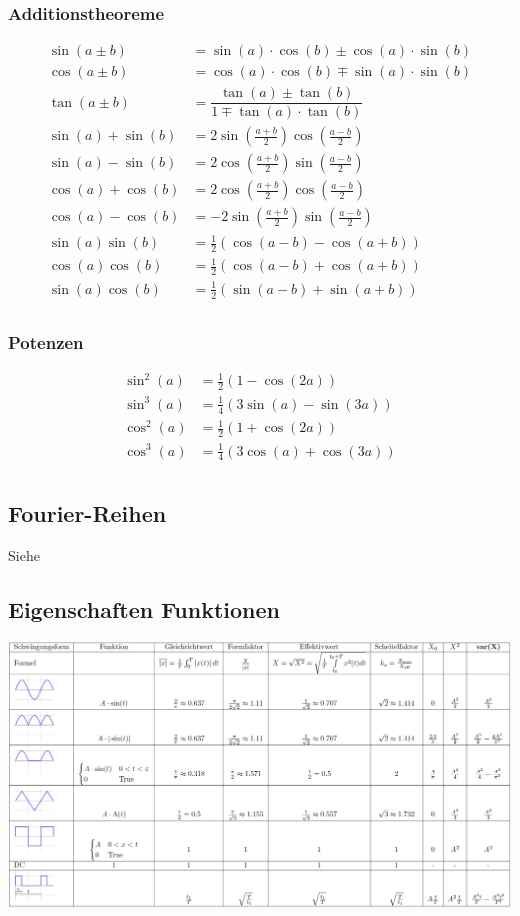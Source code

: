 \subsubsection{Additionstheoreme}
\begin{align*}
	\sin(a \pm b)&=\sin(a) \cdot \cos(b) \pm \cos(a) \cdot \sin(b)\\
	\cos(a \pm b)&=\cos(a) \cdot \cos(b) \mp \sin(a) \cdot \sin(b)\\	
	\tan(a \pm b)&=\dfrac{\tan(a) \pm \tan(b)}{1 \mp \tan(a) \cdot \tan(b)}\\
	\sin(a)+\sin(b) &= 2\sin\left(\frac{a + b}{2}\right)\cos\left(\frac{a - b}{2}\right)\\
	\sin(a)-\sin(b) &= 2\cos\left(\frac{a + b}{2}\right)\sin\left(\frac{a - b}{2}\right)\\
	\cos(a)+\cos(b) &= 2\cos\left(\frac{a + b}{2}\right)\cos\left(\frac{a - b}{2}\right)\\
	\cos(a)-\cos(b) &= -2\sin\left(\frac{a + b}{2}\right)\sin\left(\frac{a - b}{2}\right)\\
	\sin(a)\sin(b)&=\frac{1}{2}(\cos(a-b)-\cos(a+b))\\
	\cos(a)\cos(b)&=\frac{1}{2}(\cos(a-b)+\cos(a+b))\\
	\sin(a)\cos(b)&=\frac{1}{2}(\sin(a-b)+\sin(a+b))\\
\end{align*}

\subsubsection{Potenzen}
\begin{align*}
	\sin^2(a) &= \frac{1}{2}(1 - \cos(2a)) \\
	\sin^3(a) &= \frac{1}{4}(3\sin(a) - \sin(3a)) \\
	\cos^2(a) &= \frac{1}{2}(1 + \cos(2a)) \\
	\cos^3(a) &= \frac{1}{4}(3\cos(a) + \cos(3a)) \\
\end{align*}

\subsection{Fourier-Reihen}
Siehe 
\newpage

\begin{landscape}
	\section{Eigenschaften Funktionen}
	\begin{center}
		\includegraphics[width=\linewidth]{./Images/eigenschaften.png}
	\end{center}
\end{landscape}

